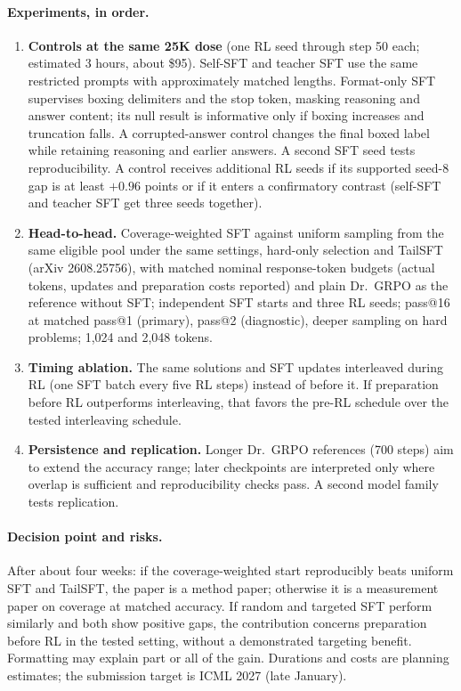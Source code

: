 \documentclass[11pt]{article}
\begin{document}
\paragraph{Experiments, in order.}
\begin{enumerate}
\item \textbf{Controls at the same 25K dose} (one RL seed through step 50 each; estimated 3 hours, about \$95).
Self-SFT and teacher SFT use the same restricted prompts with approximately matched lengths. Format-only SFT
supervises boxing delimiters and the stop token, masking reasoning and answer content; its null result is informative
only if boxing increases and truncation falls. A corrupted-answer control changes the final boxed label while
retaining reasoning and earlier answers. A second SFT seed tests reproducibility. A control receives additional RL
seeds if its supported seed-8 gap is at least $+0.96$ points or if it enters a confirmatory contrast (self-SFT and
teacher SFT get three seeds together).
\item \textbf{Head-to-head.} Coverage-weighted SFT against uniform sampling from the same eligible pool under the
same settings, hard-only selection and TailSFT (arXiv 2608.25756), with matched nominal response-token budgets
(actual tokens, updates and preparation costs reported) and plain Dr.~GRPO as the reference without SFT; independent
SFT starts and three RL seeds; pass@16 at matched pass@1 (primary), pass@2 (diagnostic), deeper sampling on hard
problems; 1,024 and 2,048 tokens.
\item \textbf{Timing ablation.} The same solutions and SFT updates interleaved during RL (one SFT batch every five
RL steps) instead of before it. If preparation before RL outperforms interleaving, that favors the pre-RL schedule
over the tested interleaving schedule.
\item \textbf{Persistence and replication.} Longer Dr.~GRPO references (700 steps) aim to extend the accuracy range;
later checkpoints are interpreted only where overlap is sufficient and reproducibility checks pass. A second model
family tests replication.
\end{enumerate}

\paragraph{Decision point and risks.} After about four weeks: if the coverage-weighted start reproducibly beats
uniform SFT and TailSFT, the paper is a method paper; otherwise it is a measurement paper on coverage at matched
accuracy. If random and targeted SFT perform similarly and both show positive gaps, the contribution concerns
preparation before RL in the tested setting, without a demonstrated targeting benefit. Formatting may explain part or
all of the gain. Durations and costs are planning estimates; the submission target is ICML 2027 (late January).
\end{document}
